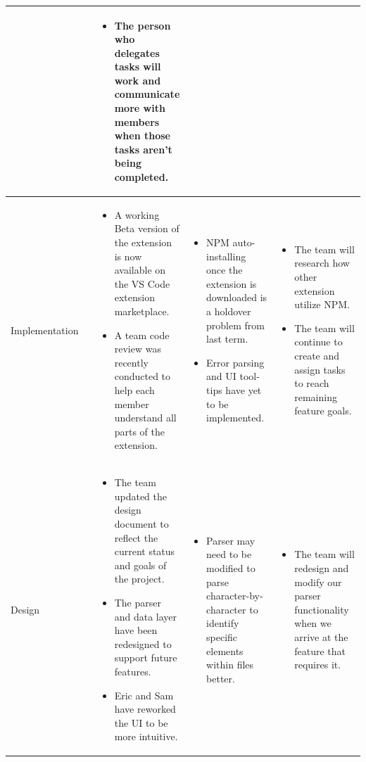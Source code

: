 \documentclass[letterpaper,10pt,titlepage,draftclsnofoot,onecolumn,onesided] {IEEEtran}
\begin{document}
\begin{center}
\begin{singlespace}
\begin{tabular}{ |  p{0.25\linewidth}  |  p{0.25\linewidth}  | p{0.25\linewidth} | p{0.25\linewidth} |}
\begin{itemize}
			\end{itemize}
		&
			\begin{itemize}
				\item The person who delegates tasks will work and communicate more with members when those tasks aren't being completed.
			\end{itemize} 
		\\ \hline
			Implementation 
		& 
			\begin{itemize}
				\item A working Beta version of the extension is now available on the VS Code extension marketplace.
				\item A team code review was recently conducted to help each member understand all parts of the extension.
			\end{itemize}
		& 
			\begin{itemize}
				\item NPM auto-installing once the extension is downloaded is a holdover problem from last term.
				\item Error parsing and UI tool-tips have yet to be implemented.
			\end{itemize}
		&
			\begin{itemize}
				\item The team will research how other extension utilize NPM.
				\item The team will continue to create and assign tasks to reach remaining feature goals.
			\end{itemize} 
		\\ \hline
			Design 
		& 
			\begin{itemize}
				\item The team updated the design document to reflect the current status and goals of the project.
				\item The parser and data layer have been redesigned to support future features.
				\item Eric and Sam have reworked the UI to be more intuitive.
			\end{itemize}
		& 
			\begin{itemize}
				\item Parser may need to be modified to parse character-by-character to identify specific elements within files better.
			\end{itemize}
		&
			\begin{itemize}
				\item The team will redesign and modify our parser functionality when we arrive at the feature that requires it.

\end{itemize}
\end{tabular}
\end{singlespace}
\end{center}
\end{document}
